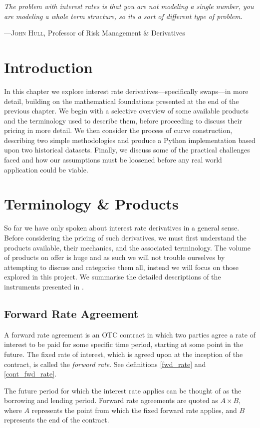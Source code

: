 \epigraph{\textit{The problem with interest rates is that you are not modeling a single number, you are modeling a whole term structure, so its a sort of different type of problem.}}{––\textsc{John Hull}, Professor of Risk Management \& Derivatives}

\section{Introduction}
In this chapter we explore interest rate derivatives––specifically swaps––in more detail, building on the mathematical foundations presented at the end of the previous chapter. We begin with a selective overview of some available products and the terminology used to describe them, before proceeding to discuss their pricing in more detail. We then consider the process of curve construction, describing two simple methodologies and produce a Python implementation based upon two historical datasets. Finally, we discuss some of the practical challenges faced and how our assumptions must be loosened before any real world application could be viable. 

\section{Terminology \& Products}
So far we have only spoken about interest rate derivatives in a general sense. Before considering the pricing of such derivatives, we must first understand the products available, their mechanics, and the associated terminology. The volume of products on offer is huge and as such we will not trouble ourselves by attempting to discuss and categorise them all, instead we will focus on those explored in this project. We summarise the detailed descriptions of the instruments presented in \cite{sadr2009interest}.

\subsection{Forward Rate Agreement}
A forward rate agreement is an OTC contract in which two parties agree a rate of interest to be paid for some specific time period, starting at some point in the future. The fixed rate of interest, which is agreed upon at the inception of the contract, is called the \textit{forward rate}. See definitions \ref{fwd_rate} and \ref{cont_fwd_rate}.

The future period for which the interest rate applies can be thought of as the borrowing and lending period. Forward rate agreements are quoted as $A \times B$, where $A$ represents the point from which the fixed forward rate applies, and $B$ represents the end of the contract.

